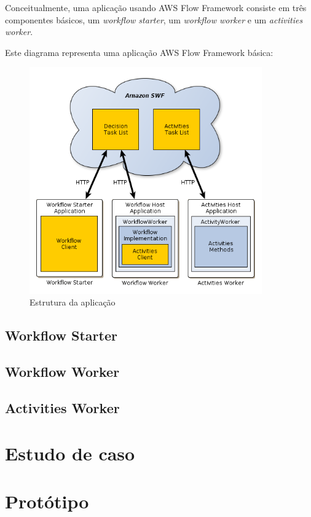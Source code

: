 Conceitualmente, uma aplicação usando AWS Flow Framework consiste em três componentes básicos, um \textit{workflow starter}, um \textit{workflow worker} e um \textit{activities worker}.

Este diagrama representa uma aplicação AWS Flow Framework básica:

\begin{figure}[htp]
	\centering
	\includegraphics[width=10cm]{imagens/application-model.png}
	\caption{Estrutura da aplicação}
	\label{fig:application-model}
\end{figure}

\subsection{Workflow Starter}

\subsection{Workflow Worker}

\subsection{Activities Worker}

\section{Estudo de caso}

\section{Protótipo}
